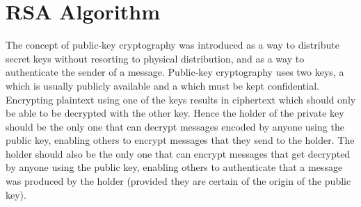 
\section{RSA Algorithm}\label{Se:RSAAlgorithm}
The concept of public-key cryptography was introduced as a way to
distribute secret keys without resorting to physical distribution,
and as a way to authenticate the sender of a message.
Public-key cryptography uses two keys, a  which is
usually publicly available and a  which must
be kept confidential. Encrypting plaintext using one of the keys
results in ciphertext which should only be able to be decrypted
with the other key. Hence the holder of the private key should be the
only one that can decrypt messages encoded by anyone using the public key,
enabling others to encrypt messages that they send to the holder.
The holder should also be the only one that can encrypt messages that
get decrypted by anyone using the public key, enabling others
to authenticate that a message was produced by the holder
(provided they are certain of the origin of the public key).

